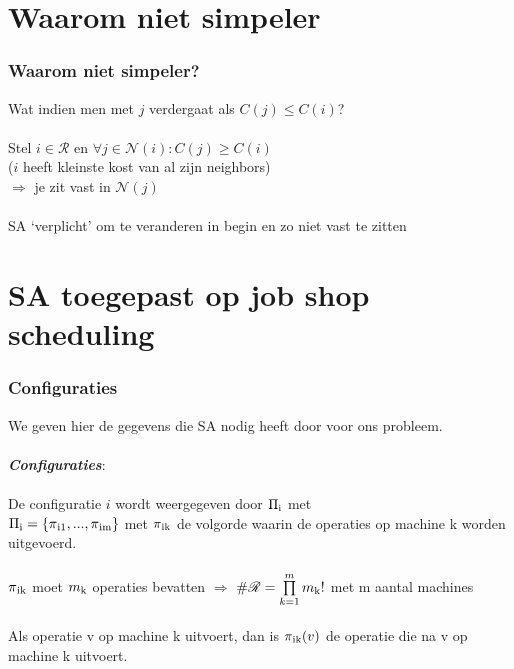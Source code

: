 \documentclass
   [kulak] %
   {kulakbeamer}
\begin{document}
\section[simpeler?]{Waarom niet simpeler}

\begin{frame}
	\frametitle{Waarom niet simpeler?}
	Wat indien men met $j$ verdergaat als $C(j) \leq C(i)$?\\~\\
	\pause
	Stel $i \in \mathscr{R}$ en $\forall j \in \mathscr{N}(i): C(j) \geqslant C(i)$ \\($i$ heeft kleinste kost van al zijn neighbors) \\
	$\Rightarrow$ je zit vast in $\mathscr{N}(j)$ \\~\\
	\pause
	SA `verplicht' om te veranderen in begin en zo niet vast te zitten
\end{frame}

\section[SA job shop]{SA toegepast op job shop scheduling}

\begin{frame}
	\frametitle{Configuraties}
	We geven hier de gegevens die SA nodig heeft door voor ons probleem.\pause 
	~\\~\\  \textbf{\textit{Configuraties}}: \\ ~\\
	De configuratie $i$ wordt weergegeven door $\Pi\textsubscript{i}$ met \\ $\Pi\textsubscript{i} = \{\pi\textsubscript{i1}, ... ,\pi\textsubscript{im}\}$
	met $\pi\textsubscript{ik}$ de volgorde waarin de operaties op machine k worden uitgevoerd. \pause	~\\~\\ $\pi\textsubscript{ik}$ moet $m\textsubscript{k}$ operaties bevatten $\Rightarrow$ $\#\mathscr{R} = \prod\limits_{k=1}^m m\textsubscript{k}!$ met m aantal machines \\~\\ Als operatie v op machine k uitvoert, dan is $\pi\textsubscript{ik}(v)$ de operatie die na v op machine k uitvoert.

\end{frame}
\end{document}
